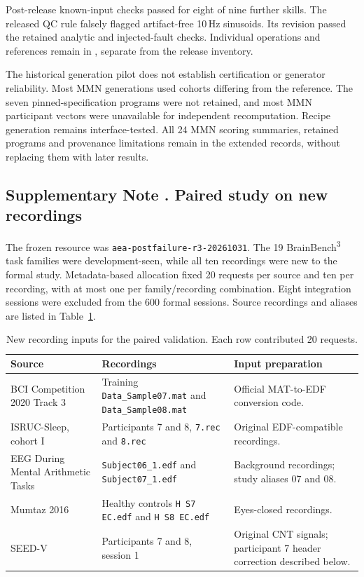Post-release known-input checks passed for eight of nine further skills. The released QC rule falsely flagged artifact-free 10\,Hz sinusoids. Its revision passed the retained analytic and injected-fault checks. Individual operations and references remain in , separate from the release inventory.

\label{si:generation}
The historical generation pilot does not establish certification or generator reliability. Most MMN generations used cohorts differing from the reference. The seven pinned-specification programs were not retained, and most MMN participant vectors were unavailable for independent recomputation. Recipe generation remains interface-tested. All 24 MMN scoring summaries, retained programs and provenance limitations remain in the extended records, without replacing them with later results.

\subsection*{Supplementary Note \thesuppnote. Paired study on new recordings}
\label{si:paired-validation}

The frozen resource was \texttt{aea-postfailure-r3-20261031}. The 19 BrainBench\textsuperscript{3} task families were development-seen, while all ten recordings were new to the formal study. Metadata-based allocation fixed 20 requests per source and ten per recording, with at most one per family/recording combination. Eight integration sessions were excluded from the 600 formal sessions. Source recordings and aliases are listed in Table~\ref*{tab:paired-recordings}.
\begin{table}[!htbp]
\centering\small
\caption{New recording inputs for the paired validation. Each row contributed 20 requests.}
\label{tab:paired-recordings}
\begin{tabular}{>{\raggedright\arraybackslash}p{4.1cm}>{\raggedright\arraybackslash}p{6.1cm}>{\raggedright\arraybackslash}p{4.5cm}}
\toprule
Source & Recordings & Input preparation \\
\midrule
BCI Competition 2020 Track 3 & Training \texttt{Data\_Sample07.mat} and \texttt{Data\_Sample08.mat} & Official MAT-to-EDF conversion code. \\
ISRUC-Sleep, cohort I & Participants 7 and 8, \texttt{7.rec} and \texttt{8.rec} & Original EDF-compatible recordings. \\
EEG During Mental Arithmetic Tasks & \texttt{Subject06\_1.edf} and \texttt{Subject07\_1.edf} & Background recordings; study aliases 07 and 08. \\
Mumtaz 2016 & Healthy controls \texttt{H S7 EC.edf} and \texttt{H S8 EC.edf} & Eyes-closed recordings. \\
SEED-V & Participants 7 and 8, session 1 & Original CNT signals; participant 7 header correction described below. \\
\bottomrule
\end{tabular}
\end{table}

